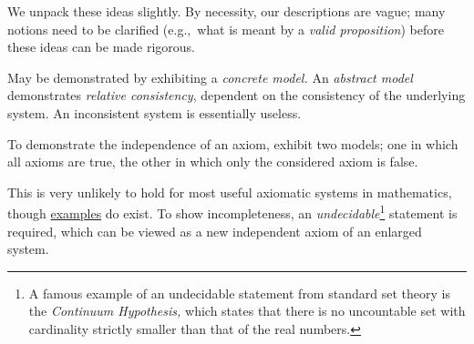 We unpack these ideas slightly. By necessity, our descriptions are vague; many notions need to be clarified (e.g.,\ what is meant by a \emph{valid proposition}) before these ideas can be made rigorous.
\begin{description}\itemsep0pt
	\item[\normalfont\emph{Consistency}] May be demonstrated by exhibiting a \emph{concrete model.} An \emph{abstract model} demonstrates \emph{relative consistency}, dependent on the consistency of the underlying system. An inconsistent system is essentially useless.
	\item[\normalfont\emph{Independence}] To demonstrate the independence of an axiom, exhibit two models; one in which all axioms are true, the other in which only the considered axiom is false. 
	\item[\normalfont\emph{Completeness}] This is very unlikely to hold for most useful axiomatic systems in mathematics, though \href{https://en.wikipedia.org/wiki/Complete_theory}{examples} do exist. To show incompleteness, an \emph{undecidable}\footnote{A famous example of an undecidable statement from standard set theory is the \emph{Continuum Hypothesis,} which states that there is no uncountable set with cardinality strictly smaller than that of the real numbers.} statement is required, which can be viewed as a new independent axiom of an enlarged system. 
	\end{description}


